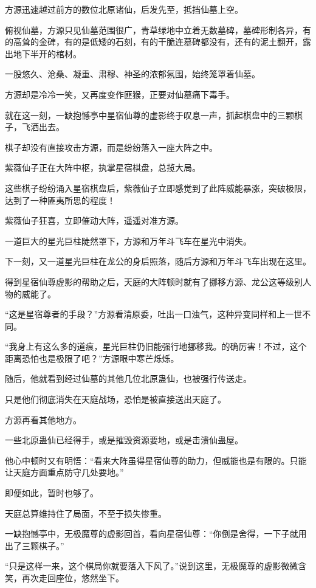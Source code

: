 \begin{this_body}
方源迅速越过前方的数位北原诸仙，后发先至，抵挡仙墓上空。

俯视仙墓，方源只见仙墓范围很广，青草绿地中立着无数墓碑，墓碑形制各异，有的高耸的金碑，有的是低矮的石刻，有的干脆连墓碑都没有，还有的泥土翻开，露出地下半开的棺材。

一股悠久、沧桑、凝重、肃穆、神圣的浓郁氛围，始终笼罩着仙墓。

方源却是冷冷一笑，又再度变作匪猴，正要对仙墓痛下毒手。

就在这一刻，一缺抱憾亭中星宿仙尊的虚影终于叹息一声，抓起棋盘中的三颗棋子，飞洒出去。

棋子却没有直接攻击方源，而是纷纷落入一座大阵之中。

紫薇仙子正在大阵中枢，执掌星宿棋盘，总揽大局。

这些棋子纷纷涌入星宿棋盘后，紫薇仙子立即感觉到了此阵威能暴涨，突破极限，达到了一种匪夷所思的程度！

紫薇仙子狂喜，立即催动大阵，遥遥对准方源。

一道巨大的星光巨柱陡然罩下，方源和万年斗飞车在星光中消失。

下一刻，又一道星光巨柱在龙公的身后照落，随后方源和万年斗飞车出现在这里。

得到星宿仙尊虚影的帮助之后，天庭的大阵顿时就有了挪移方源、龙公这等级别人物的威能了。

“这是星宿尊者的手段？”方源看清原委，吐出一口浊气，这种异变同样和上一世不同。

“我身上有这么多的道痕，星光巨柱仍旧能强行地挪移我。的确厉害！不过，这个距离恐怕也是极限了吧？”方源眼中寒芒烁烁。

随后，他就看到经过仙墓的其他几位北原蛊仙，也被强行传送走。

只是他们彻底消失在天庭战场，恐怕是被直接送出天庭了。

方源再看其他地方。

一些北原蛊仙已经得手，或是摧毁资源要地，或是击溃仙蛊屋。

他心中顿时又有明悟：“看来大阵虽得星宿仙尊的助力，但威能也是有限的。只能让天庭方面重点防守几处要地。”

即便如此，暂时也够了。

天庭总算维持住了局面，不至于损失惨重。

一缺抱憾亭中，无极魔尊的虚影回首，看向星宿仙尊：“你倒是舍得，一下子就用出了三颗棋子。”

“只是这样一来，这个棋局你就要落入下风了。”说到这里，无极魔尊的虚影微微含笑，再次走回座位，悠然坐下。


\end{this_body}
